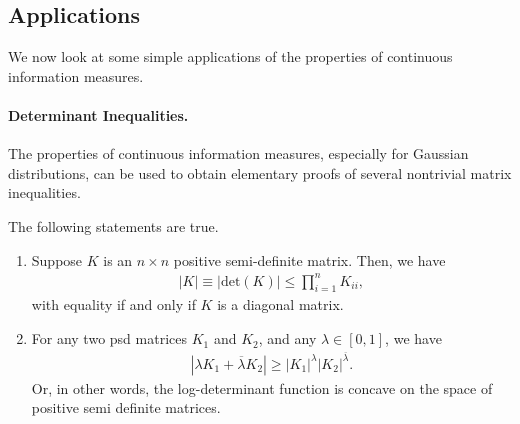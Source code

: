         \subsection{Applications}
        \label{subsec:applications-continuous}
            We now look at some simple applications of the properties of continuous information measures. 
            
            \paragraph{Determinant Inequalities.} The properties of continuous information measures, especially for Gaussian distributions, can be used to obtain elementary proofs of several nontrivial matrix inequalities. 
            \begin{proposition}
                The following statements are true. 
                \begin{enumerate}[label=(\alph*)]
                    \item  Suppose $K$ is an $n \times n$ positive semi-definite matrix. Then, we have 
                    \begin{align}
                        |K| \equiv |\text{det}(K)| \leq \prod_{i=1}^n K_{ii}, 
                    \end{align}
                    with equality if and only if $K$ is a diagonal matrix. 
                    \item  For any two psd matrices $K_1$ and $K_2$, and any $\lambda \in [0, 1]$, we have 
                    \begin{align}
                        |\lambda K_1 + \overline{\lambda} K_2| \geq |K_1|^{\lambda} |K_2|^{\overline{\lambda}}.   
                    \end{align}
                    Or, in other words, the log-determinant function is concave on the space of positive semi definite matrices. 
                \end{enumerate}
            \end{proposition}
